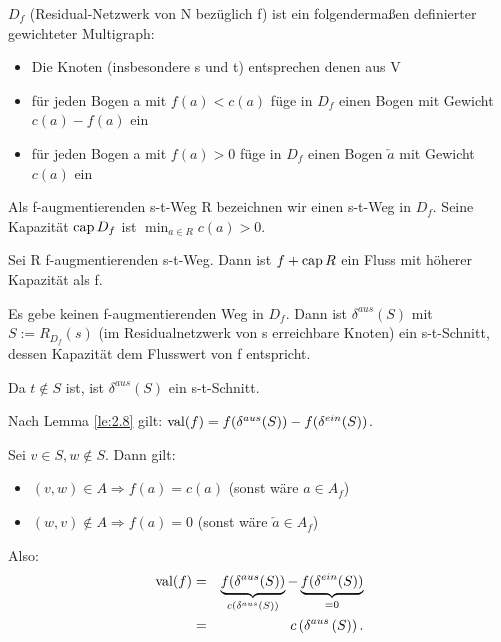 \documentclass[10pt]{scrbook}
\begin{document}
\begin{Def}
$D_f$ (Residual-Netzwerk von N bezüglich f) ist ein folgendermaßen definierter gewichteter Multigraph:
\begin{itemize}
\item Die Knoten (insbesondere s und t) entsprechen denen aus V
\item für jeden Bogen a mit $f(a) < c(a)$ füge in $D_f$ einen Bogen mit Gewicht $c(a)-f(a)$ ein
\item für jeden Bogen a mit $f(a) > 0$ füge in $D_f$ einen Bogen $\overleftarrow{a}$ mit Gewicht $c(a)$ ein
\end{itemize}
\end{Def}

\begin{Def}
Als f-augmentierenden s-t-Weg R bezeichnen wir einen s-t-Weg in $D_f$. Seine Kapazität $\operatorname{cap} D_f$ ist $\min_{a\in R} c(a)>0$.
\end{Def}

\begin{Bem}
Sei R f-augmentierenden s-t-Weg. Dann ist $f+\operatorname{cap} R$ ein Fluss mit höherer Kapazität als f.
\end{Bem}

\begin{Le}
Es gebe keinen f-augmentierenden Weg in $D_f$. Dann ist $\delta^{aus}(S)$ mit $S:=R_{D_f}(s)$ (im Residualnetzwerk von s erreichbare Knoten) ein s-t-Schnitt, dessen Kapazität dem Flusswert von f entspricht.
\end{Le}
\begin{bew}
Da $t\notin S$ ist, ist $\delta^{aus}(S)$ ein s-t-Schnitt.

Nach Lemma \ref{le:2.8} gilt: $\operatorname{val}(f)=f(\delta^{aus}(S))-f(\delta^{ein}(S))$.

Sei $v\in S, w\notin S$. Dann gilt:
\begin{itemize}
\item $(v, w)\in A\Rightarrow f(a)=c(a)$ (sonst wäre $a\in A_f$)
\item $(w, v)\notin A\Rightarrow f(a)=0$ (sonst wäre $\overleftarrow{a}\in A_f$)
\end{itemize}

Also: 
\begin{eqnarray*}
\operatorname{val}(f) & = & \underbrace{f(\delta^{aus}(S))}_{c\left(\delta^{aus}\left(S\right)\right)}-\underbrace{f(\delta^{ein}(S))}_{=0} \\
& = & c\left(\delta^{aus}\left(S\right)\right).
\end{eqnarray*}
\end{bew}
\end{document}
